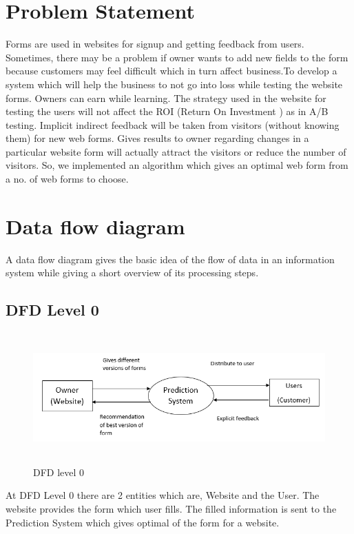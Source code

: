 \documentclass[12pt]{report}
\begin{document}
\section{Problem Statement}
Forms are used in websites for signup and getting feedback from users. Sometimes, there may be a problem if owner wants to add new fields to the form because customers may feel difficult which in turn affect business.To develop a system which will help the business to not go into loss while testing the website forms. Owners can earn while learning. The strategy used in the website for testing the users will not affect the ROI (Return On Investment ) as in A/B testing\cite{seckler2015trust}. Implicit indirect feedback will be taken from visitors (without knowing them) for new web forms. Gives results to owner regarding changes in a particular website form will actually attract the visitors or reduce the number of visitors. So, we implemented an algorithm which gives an optimal web form from a no. of web forms to choose.
\newpage
\section{Data flow diagram}
A data flow diagram gives the basic idea of the flow of data in an information system while giving a short overview of its processing steps.
\subsection{DFD Level 0}
\begin{figure}[!ht]
\includegraphics[scale=0.7,height=5cm,width=16.5cm]{dfd0.png}
\caption{DFD level 0}
\end{figure}
At DFD Level 0 there are 2 entities which are, Website and the User. The website provides the form which user fills. The filled information is sent to the Prediction System which gives optimal of the form for a website.
\newpage
\end{document}
